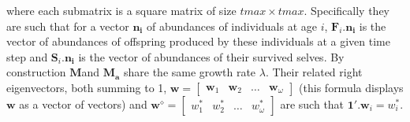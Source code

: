 \documentclass[10pt,a4paper]{article}
\newcommand{\M}{$\mathbf{M}$}
\begin{document}
where each submatrix is a square matrix of size $tmax \times tmax$. Specifically they are such that for a vector $\bm{n_i}$ of abundances of  individuals at age $i$, $\mathbf{F}_{i}.\bm{n_i}$  is the vector of abundances of offspring produced by these individuals at a given time step and $\mathbf{S}_{i}.\bm{n_i}$ is the vector of abundances of their survived selves. By construction \M and $\mathbf{M_a}$ share the same growth rate $\lambda $. Their related right eigenvectors, both summing to 1,  $\bm{w}= \begin{bmatrix} \bm{w}_{1} &\bm{w}_{2} & \dots & \bm{w}_{\omega} \end{bmatrix}$ (this formula displays $\bm{w}$ as a vector of vectors) and $\bm{w^{\diamond}}=\begin{bmatrix} w^{*}_{1} & w^{*}_{2} & \dots & w^{*}_{\omega} \end{bmatrix}$ are such that $\bm{1}'. \bm{w}_{i}=w^{*}_{i}$.\\
\end{document}
